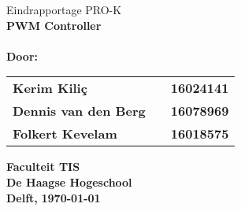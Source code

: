 \begin{center}
\vspace{1.0cm}
{\fontsize{55}{66}\selectfont Eindrapportage PRO-K }
\vspace{5.0cm}
\LARGE{\textbf{\\PWM Controller\\}}
\vspace{1cm}
\Large{\textbf{\\Door:}}
\begin{table}[H]
\Large{
\begin{tabular}{>{\bfseries}lc>{\bfseries}r}
Kerim Kiliç & & 16024141\\Dennis van den Berg & & 16078969\\Folkert Kevelam & & 16018575\\
\end{tabular}}
\end{table}

\vspace{1cm}
\large{\textbf{Faculteit TIS}}\\
\Large{\textbf{De Haagse Hogeschool}}\\
\large{\textbf{Delft,}}
\large{\textbf{\today}}\\
\vspace{1cm}

\end{center}


